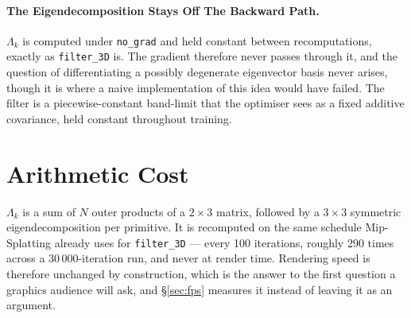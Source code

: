 \paragraph{The Eigendecomposition Stays Off The Backward Path.} $\Lambda_k$ is
computed under \texttt{no\_grad} and held constant between recomputations,
exactly as \texttt{filter\_3D} is. The gradient therefore never passes through
it, and the question of differentiating a possibly degenerate eigenvector basis
never arises, though it is where a naive implementation of
this idea would have failed. The filter is a piecewise-constant
band-limit that the optimiser sees as a fixed additive covariance, held constant throughout
training.

\section{Arithmetic Cost}
$\Lambda_k$ is a sum of $N$ outer products of a $2\times3$ matrix, followed by a
$3\times3$ symmetric eigendecomposition per primitive. It is recomputed on the
same schedule Mip-Splatting already uses for \texttt{filter\_3D} --- every 100
iterations, roughly 290 times across a 30\,000-iteration run, and never at
render time. Rendering speed is therefore unchanged by construction, which is
the answer to the first question a graphics audience will ask, and \S\ref{sec:fps} measures it instead of leaving it as an argument.
